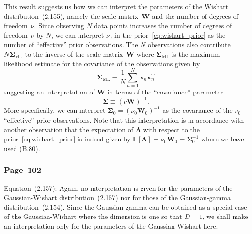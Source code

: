 \documentclass[12pt,a4paper]{article}
\newcommand{\erratum}[1]{%
\subsubsection*{#1}
\addcontentsline{toc}{subsection}{#1}}
\begin{document}
This result suggests us how we can interpret the parameters of
the Wishart distribution~(2.155), namely
the scale matrix~$\mathbf{W}$ and the number of degrees of freedom~$\nu$.
Since observing $N$ data points increases the number of degrees of freedom~$\nu$ by $N$,
we can interpret $\nu_0$ in the prior~\eqref{eq:wishart_prior} as
the number of ``effective'' prior observations.
The $N$ observations also contribute $N\bm{\Sigma}_{\text{ML}}$ to
the inverse of the scale matrix~$\mathbf{W}$
where $\bm{\Sigma}_{\text{ML}}$ is the maximum likelihood estimate for the covariance of
the observations given by
\begin{equation}
\bm{\Sigma}_{\text{ML}} = \frac{1}{N} \sum_{n=1}^{N}\mathbf{x}_n\mathbf{x}_n^{\operatorname{T}}
\end{equation}
suggesting an interpretation of $\mathbf{W}$ in terms of the ``covariance'' parameter
\begin{equation}
\bm{\Sigma} \equiv \left(\nu\mathbf{W}\right)^{-1} .
\label{eq:covariance_parameter}
\end{equation}
More specifically, we can interpret $\bm{\Sigma}_0 = \left(\nu_0\mathbf{W}_0\right)^{-1}$ as
the covariance of the $\nu_0$ ``effective'' prior observations.
Note that this interpretation is in accordance with another observation that
the expectation of $\bm{\Lambda}$ with respect to
the prior~\eqref{eq:wishart_prior} is indeed given by
$\mathbb{E}\left[\bm{\Lambda}\right] = \nu_0\mathbf{W}_0 = \bm{\Sigma}_0^{-1}$
where we have used (B.80).

\erratum{Page~102}
Equation~(2.157):
Again, no interpretation is given for the parameters of the Gaussian-Wishart distribution~(2.157)
nor for those of the Gaussian-gamma distribution~(2.154).
Since the Gaussian-gamma can be obtained as a special case of the Gaussian-Wishart
where the dimension is one so that $D=1$,
we shall make an interpretation only for the parameters of the Gaussian-Wishart here.
\end{document}
